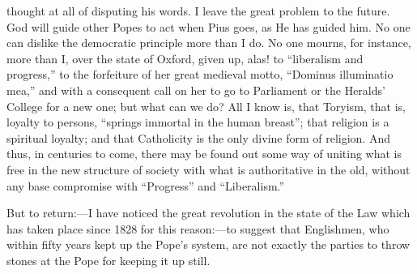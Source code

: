 thought at all of disputing his words. I leave the great problem to the
future. God will guide other Popes to act when Pius goes, as He has
guided him. No one can dislike the democratic principle more than I do.
No one mourns, for instance, more than I, over the state of Oxford,
given up, alas! to ``liberalism and progress,'' to the
forfeiture of her great medieval motto, ``Dominus illuminatio
mea,'' and with a consequent call on her to go to Parliament or the
Heralds' College for a new one; but what can we do? All I know is, that
Toryism, that is, loyalty to persons, ``springs immortal in the
human breast''; that religion is a spiritual loyalty; and that
Catholicity is the only divine form of religion. And thus, in centuries
to come, there may be found out some way of uniting what is free in the
new structure of society with what is authoritative in the old, without
any base compromise with ``Progress'' and
``Liberalism.''

But to return:—I have noticed the great revolution in the
state of the Law which has taken place since 1828 for this reason:—to
suggest that Englishmen, who within fifty years kept up the Pope's
system, are not exactly the parties to throw stones at the Pope for
keeping it up still.

